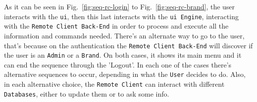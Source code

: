 As it can be seen in Fig.~\ref{fig:seq-rc-login} to Fig.~\ref{fig:seq-rc-brand}, the user interacts with the \texttt{\gls{ui}}, then this last interacts with the \texttt{\gls{ui} Engine}, interacting with the \texttt{Remote Client Back-End} in order to process and execute all the information and commands needed. 
There's an alternate way to go to the user, that's because on the authentication the \texttt{Remote Client Back-End} will discover if the user is an \texttt{Admin} or a \texttt{Brand}.
On both cases, it shows its main menu and it can end the sequence through the 'Logout'.
In each one of the cases there's alternative sequences to occur, depending in what the \texttt{User} decides to do.
Also, in each alternative choice, the \texttt{Remote Client} can interact with different \texttt{Databases}, either to update them or to ask some info.



